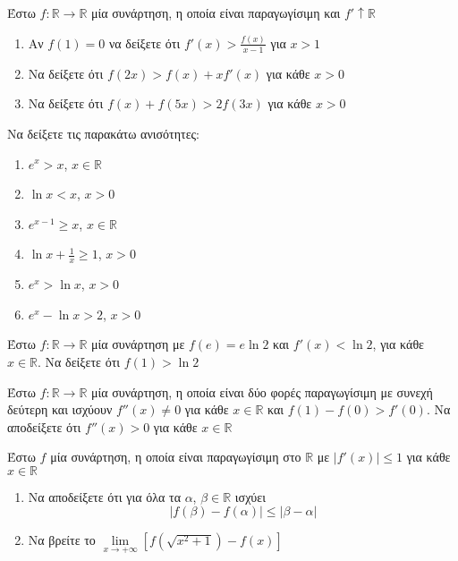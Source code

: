 \documentclass{presentation}
\begin{document}
\begin{askisi}
    Έστω $f:\mathbb{R}\to\mathbb{R}$ μία συνάρτηση, η οποία είναι παραγωγίσιμη και $f'\uparrow \mathbb{R}$
    \begin{enumerate}
        \item<1-> Αν $f(1)=0$ να δείξετε ότι $f'(x)>\frac{f(x)}{x-1}$ για $x>1$
        \item<2-> Να δείξετε ότι $f(2x)>f(x)+xf'(x)$ για κάθε $x>0$
        \item<3-> Να δείξετε ότι $f(x)+f(5x)>2f(3x)$ για κάθε $x>0$
    \end{enumerate}

\end{askisi}

\begin{askisi}
    Να δείξετε τις παρακάτω ανισότητες:
    \begin{enumerate}
        \item<1-> $e^x> x$, $x\in\mathbb{R}$
        \item<2-> $\ln x<x$, $x>0$
        \item<3-> $e^{x-1}\ge x$, $x\in\mathbb{R}$
        \item<4-> $\ln x+\frac{1}{x}\ge 1$, $x>0$
        \item<5-> $e^x>\ln x$, $x>0$
        \item<6-> $e^x-\ln x>2$, $x>0$
    \end{enumerate}

\end{askisi}

\begin{askisi}
    Έστω $f:\mathbb{R}\to\mathbb{R}$ μία συνάρτηση με $f(e)=e\ln 2$ και $f'(x)<\ln 2$, για κάθε $x\in \mathbb{R}$. Να δείξετε ότι $f(1)>\ln 2$

\end{askisi}

\begin{askisi}
    Έστω $f:\mathbb{R}\to\mathbb{R}$ μία συνάρτηση, η οποία είναι δύο φορές παραγωγίσιμη με συνεχή δεύτερη και ισχύουν $f''(x)\ne 0$ για κάθε $x\in\mathbb{R}$ και $f(1)-f(0)>f'(0)$. Να αποδείξετε ότι $f''(x)>0$ για κάθε $x\in\mathbb{R}$

\end{askisi}

\begin{askisi}
    Έστω $f$ μία συνάρτηση, η οποία είναι παραγωγίσιμη στο $\mathbb{R}$ με $|f'(x)|\le 1$ για κάθε $x\in\mathbb{R}$
    \begin{enumerate}
        \item<1-> Να αποδείξετε ότι για όλα τα $α$, $β\in\mathbb{R}$ ισχύει
              $$|f(β)-f(α)|\le |β-α|$$
        \item<2-> Να βρείτε το $\lim\limits_{x \to +\infty}{ \left[  f\left( \sqrt{x^2+1} \right)-f(x)  \right]}$
    \end{enumerate}
\end{askisi}
\end{document}
